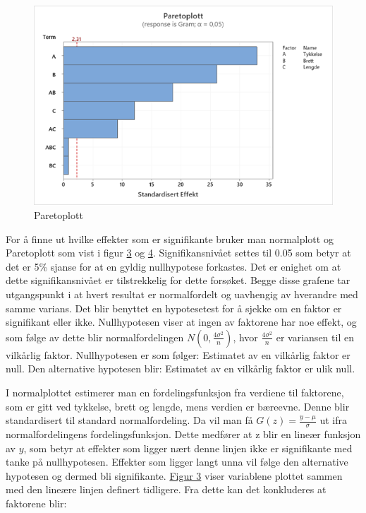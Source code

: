 \documentclass[12pt]{article}
\begin{document}
\begin{figure}[H]
    \centering
    \includegraphics[scale=0.7]{Figur 4.png}
    \caption{Paretoplott}
    \label{fig:fig4}
\end{figure}
\clearpage

For å finne ut hvilke effekter som er signifikante bruker man normalplott og Paretoplott som vist i figur \hyperref[fig:fig3]{3} og \hyperref[fig:fig4]{4}. Signifikansnivået settes til 0.05 som betyr at det er 5\% sjanse for at en gyldig nullhypotese forkastes. Det er enighet om at dette signifikansnivået er tilstrekkelig for dette forsøket.
Begge disse grafene tar utgangspunkt i at hvert resultat er normalfordelt og uavhengig av hverandre med samme varians. Det blir benyttet en hypotesetest for å sjekke om en faktor er signifikant eller ikke. Nullhypotesen viser at ingen av faktorene har noe effekt, og som følge av dette blir normalfordelingen $N(0 , \frac{4\sigma^2}{n})$, hvor $\frac{4\sigma^2}{n}$ er variansen til en vilkårlig faktor. 
Nullhypotesen er som følger: Estimatet av en vilkårlig faktor er null.
Den alternative hypotesen blir: Estimatet av en vilkårlig faktor er ulik null. 

I normalplottet estimerer man en fordelingsfunksjon fra verdiene til faktorene, som er gitt ved tykkelse, brett og lengde, mens verdien er bæreevne. Denne blir standardisert til standard normalfordeling. Da vil man få $G(z)=\frac{y-\mu}{\sigma}$ ut ifra normalfordelingens fordelingsfunksjon. Dette medfører at z blir en lineær funksjon av $y$, som betyr at effekter som ligger nært denne linjen ikke er signifikante med tanke på nullhypotesen. Effekter som ligger langt unna vil følge den alternative hypotesen og dermed bli signifikante.\cite{1}
\hyperref[fig:fig3]{Figur 3} viser variablene plottet sammen med den lineære linjen definert tidligere. Fra dette kan det konkluderes at faktorene blir:
\end{document}

